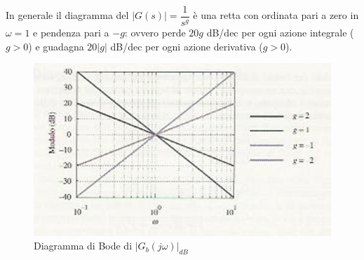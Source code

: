 \documentclass[a4paper]{report}
\begin{document}
In generale il diagramma del $|G(s)| = \dfrac{1}{s^g}$ \`e una retta con
ordinata pari a zero in $\omega = 1$ e pendenza pari a  $-g$: ovvero perde $20g$
dB/dec per ogni azione integrale ($g > 0$) e guadagna $20|g|$ dB/dec
per ogni azione derivativa ($g > 0$).
\begin{figure}[!t]
  \begin{center}
    \includegraphics[scale=0.5]{./figures/diagmod2.png}
    \caption{Diagramma di Bode di $|G_b(j\omega)|_{dB}$}
    \label{fig:bode2}
  \end{center}
\end{figure}
 
\end{document}

